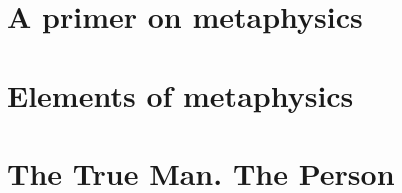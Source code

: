 \documentclass[a4paper,12pt,twoside]{book}
\begin{document}
\chapter{A primer on metaphysics}










\chapter{Elements of metaphysics}


















\chapter{The True Man. The Person}









\end{document}
